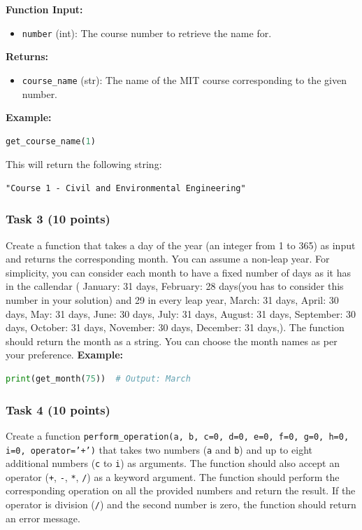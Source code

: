 \documentclass[12pt]{article}
\begin{document}
\textbf{Function Input:}
\begin{itemize}
\item \texttt{number} (int): The course number to retrieve the name for.
\end{itemize}

\textbf{Returns:}
\begin{itemize}
\item \texttt{course\_name} (str): The name of the MIT course corresponding to the given number.
\end{itemize}

\textbf{Example:}
\begin{lstlisting}[language=Python]
get_course_name(1)
\end{lstlisting}
This will return the following string:
\begin{verbatim}
"Course 1 - Civil and Environmental Engineering"
\end{verbatim}


\subsubsection{Task 3 (10 points)}
Create a function that takes a day of the year (an integer from 1 to 365) as input and returns the corresponding month. You can assume a non-leap year. For simplicity, you can consider each month to have a fixed number of days as it has in the callendar (
    January: 31 days,
    February: 28 days(you has to consider this number in your solution) and 29 in every leap year,
    March: 31 days,
    April: 30 days,
    May: 31 days,
    June: 30 days,
    July: 31 days,
    August: 31 days,
    September: 30 days,
    October: 31 days,
    November: 30 days,
    December: 31 days,). The function should return the month as a string. You can choose the month names as per your preference.
\textbf{Example:}
\begin{lstlisting}[language=Python]
print(get_month(75))  # Output: March
\end{lstlisting}


\subsubsection{Task 4 (10 points)}
Create a function \texttt{perform\_operation(a, b, c=0, d=0, e=0, f=0, g=0, h=0, i=0, operator='+')} that takes two numbers (\texttt{a} and \texttt{b}) and up to eight additional numbers (\texttt{c} to \texttt{i}) as arguments. The function should also accept an operator (\texttt{+}, \texttt{-}, \texttt{*}, \texttt{/}) as a keyword argument. The function should perform the corresponding operation on all the provided numbers and return the result. If the operator is division (\texttt{/}) and the second number is zero, the function should return an error message.
\end{document}
